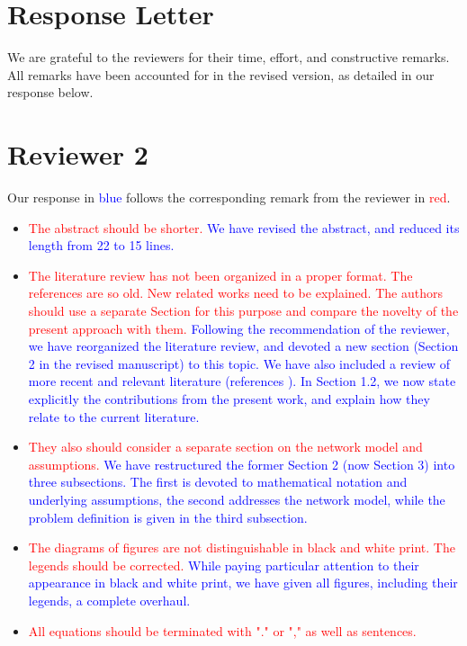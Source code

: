\documentclass[12pt]{article}
\begin{document}
\section*{Response Letter}
We are grateful to the reviewers for their time, effort, and constructive remarks.
All remarks have been accounted for in the revised version, as detailed in our response below.

\section*{Reviewer 2}
Our response in \textcolor{blue}{blue} follows the corresponding remark from the reviewer in \textcolor{red}{red}.

\begin{itemize}
\item \textcolor{red}{The abstract should be shorter.} \textcolor{blue}{
We have revised the abstract, and reduced its length from 22 to 15 lines.
}
\item \textcolor{red}{The literature review has not been organized in a proper format. The references are so old. New related works need to be explained. The authors should use a separate Section for this purpose and compare the novelty of the present approach with them.} \textcolor{blue}{
Following the recommendation of the reviewer, we have reorganized the literature review, and devoted a new section (Section 2 in the revised manuscript)
to this topic. We have also included a review of more recent and relevant literature (references \cite{bein10, bhukya14}).
In Section 1.2, we now state explicitly the contributions from the present work, and explain how they relate to the current literature.
}
\item \textcolor{red}{They also should consider a separate section on the network model and assumptions.} \textcolor{blue}{
We have restructured the former Section 2 (now Section 3) into three subsections.
The first is devoted to mathematical notation and underlying assumptions, the second addresses the network model,
while the problem definition is given in the third subsection.
}
\item \textcolor{red}{The diagrams of figures are not distinguishable in black and white print. The legends should be corrected.} \textcolor{blue}{
While paying particular attention to their appearance in black and white print, we have given all figures,
including their legends, a complete overhaul.
}
\item \textcolor{red}{All equations should be terminated with "." or "," as well as sentences.} \textcolor{blue}{
}
\end{itemize}
\end{document}
